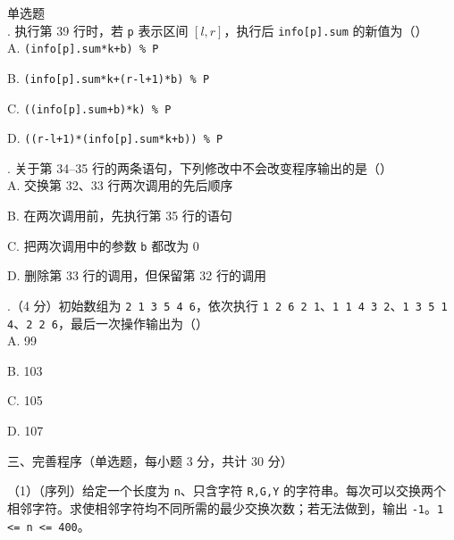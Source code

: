 \documentclass[a4paper]{ctexart}
\newcommand{\wdot}{{\fontsize{12}{12}\selectfont\textbullet}}
\newcommand{\bigtitle}[1]{\noindent\heiti #1\par\vspace{2pt}}
\newcommand{\q}[1]{\noindent #1}
\newcommand{\opt}[1]{\hspace*{2em} #1\par}
\begin{document}
\noindent\wdot\hspace{0.5em}单选题\\
\q{30.} 执行第 39 行时，若 \texttt{p} 表示区间 \([l,r]\)，执行后 \texttt{info[p].sum} 的新值为（\qquad）\\
\opt{A. \texttt{(info[p].sum*k+b) \% P}}
\opt{B. \texttt{(info[p].sum*k+(r-l+1)*b) \% P}}
\opt{C. \texttt{((info[p].sum+b)*k) \% P}}
\opt{D. \texttt{((r-l+1)*(info[p].sum*k+b)) \% P}}
\begin{minipage}{\linewidth}
\q{31.} 关于第 34--35 行的两条语句，下列修改中不会改变程序输出的是（\qquad）\\
\opt{A. 交换第 32、33 行两次调用的先后顺序}
\opt{B. 在两次调用前，先执行第 35 行的语句}
\opt{C. 把两次调用中的参数 \texttt{b} 都改为 0}
\opt{D. 删除第 33 行的调用，但保留第 32 行的调用}
\end{minipage}
\q{32.}（4 分）初始数组为 \texttt{2 1 3 5 4 6}，依次执行 \texttt{1 2 6 2 1}、\texttt{1 1 4 3 2}、\texttt{1 3 5 1 4}、\texttt{2 2 6}，最后一次操作输出为（\qquad）\\
\opt{A. 99}\opt{B. 103}\opt{C. 105}\opt{D. 107}
\clearpage
\bigtitle{三、完善程序（单选题，每小题 3 分，共计 30 分）}

\noindent（1）（序列）给定一个长度为 \texttt{n}、只含字符 \texttt{R,G,Y} 的字符串。每次可以交换两个相邻字符。求使相邻字符均不同所需的最少交换次数；若无法做到，输出 \texttt{-1}。\texttt{1 <= n <= 400}。
\end{document}
